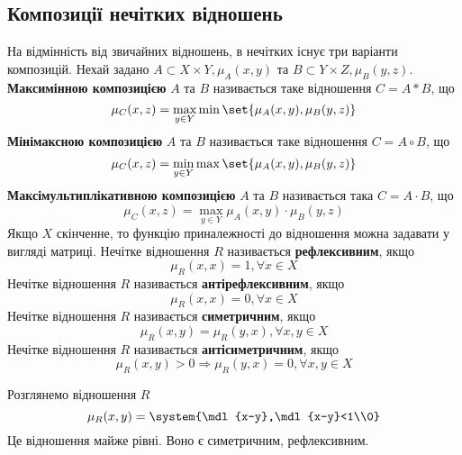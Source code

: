 \subsection{Композиції нечітких відношень}
На відмінність від звичайних відношень, в нечітких існує три варіанти композицій. Нехай задано $A\subset X\times Y,\mu_A(x,y)$ та $B\subset Y\times Z,\mu_B(y,z)$.\\
\textbf{Максимінною композицією} $A$ та $B$ називається таке відношення $C=A\ast B$, що 
\begin{equation}
\mu_C(x,z) = \max\limits_{y\in Y}\min\set{\mu_A(x,y),\mu_B(y,z)}
\end{equation}
\textbf{Мінімаксною композицією} $A$ та $B$ називається таке відношення $C=A\circ B$, що 
\begin{equation}
\mu_C(x,z) = \min\limits_{y\in Y}\max\set{\mu_A(x,y),\mu_B(y,z)}
\end{equation}
\textbf{Максімультиплікативною композицією} $A$ та $B$ називається така $C=A\cdot B$, що 
\begin{equation}
\mu_C(x,z) = \max\limits_{y\in Y} \mu_A(x,y)\cdot \mu_B(y,z)
\end{equation}
Якщо $X$ скінченне, то функцію приналежності до відношення можна задавати у вигляді матриці.
Нечітке відношення $R$ називається \textbf{рефлексивним}, якщо 
\begin{equation}
\mu_R(x,x)=1,\forall x\in X
\end{equation}
Нечітке відношення $R$ називається \textbf{антірефлексивним}, якщо 
\begin{equation}
\mu_R(x,x)=0,\forall x\in X
\end{equation}
Нечітке відношення $R$ називається \textbf{симетричним}, якщо 
\begin{equation}
\mu_R(x,y)=\mu_R(y,x),\forall x,y\in X
\end{equation}
Нечітке відношення $R$ називається \textbf{антісиметричним}, якщо 
\begin{equation}
\mu_R(x,y)>0\Rightarrow \mu_R(y,x)=0,\forall x,y\in X
\end{equation}
\begin{exs}
Розглянемо відношення $R$
\begin{equation}
\mu_R(x,y) = \system{\mdl{x-y},\mdl{x-y}<1\\0}
\end{equation}
Це відношення майже рівні.
Воно є симетричним, рефлексивним.
\end{exs}

